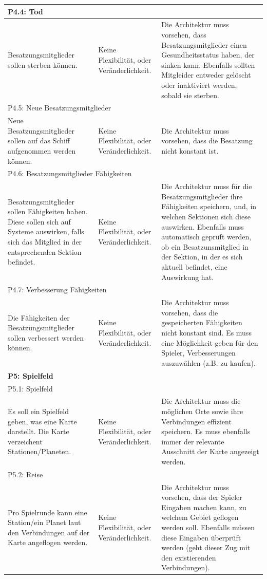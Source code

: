 \documentclass[fontsize=12pt,paper=a4,twoside]{scrartcl}
\begin{document}
\begin{longtable}[c]{|p{5cm}|p{5cm}|p{5cm}|}
\\ \hline
\multicolumn{3}{|l|}{{P4.4: Tod}} 
\\ \hline
Besatzungsmitglieder sollen sterben können. & Keine Flexibilität, oder Veränderlichkeit.    & Die Architektur muss vorsehen, dass Besatzungsmitglieder einen Gesundheitsstatus haben, der sinken kann. Ebenfalls sollten Mitgleider entweder gelöscht oder inaktiviert werden, sobald sie sterben. 
\\ \hline
\multicolumn{3}{|l|}{{P4.5: Neue Besatzungsmitglieder}} 
\\ \hline
Neue Besatzungsmitglieder sollen auf das Schiff aufgenommen werden können. & Keine Flexibilität, oder Veränderlichkeit.    &  Die Architektur muss vorsehen, dass die Besatzung nicht konstant ist. 
\\ \hline
\multicolumn{3}{|l|}{{P4.6: Besatzungsmitglieder Fähigkeiten}} 
\\ \hline
Besatzungsmitglieder sollen Fähigkeiten haben. Diese sollen sich auf Systeme auswirken, falls sich das Mitglied in der entsprechenden Sektion befindet. & Keine Flexibilität, oder Veränderlichkeit.    &  Die Architektur muss für die Besatzungsmitglieder ihre Fähigkeiten speichern, und, in welchen Sektionen sich diese auswirken. Ebenfalls muss automatisch geprüft werden, ob ein Besatzunsmitglied in der Sektion, in der es sich aktuell befindet, eine Auswirkung hat. 
\\ \hline
\multicolumn{3}{|l|}{{P4.7: Verbesserung Fähigkeiten}} 
\\ \hline
Die Fähigkeiten der Besatzungsmitglieder sollen verbessert werden können. & Keine Flexibilität, oder Veränderlichkeit.    & Die Architektur muss vorsehen, dass die gespeicherten Fähigkeiten nicht konstant sind. Es muss eine Möglichkeit geben für den Spieler, Verbesserungen auszuwählen (z.B. zu kaufen). 
\\ \hline
%
\multicolumn{3}{|l|}{{\textbf{P5: Spielfeld}}} 
\\ \hline         
\multicolumn{3}{|l|}{{P5.1: Spielfeld}} 
\\ \hline
Es soll ein Spielfeld geben, was eine Karte darstellt. Die Karte verzeichent Stationen/Planeten. & Keine Flexibilität, oder Veränderlichkeit.    & Die Architektur muss die möglichen Orte sowie ihre Verbindungen effizient speichern. Es muss ebenfalls immer der relevante Ausschnitt der Karte angezeigt werden. 
\\ \hline          
\multicolumn{3}{|l|}{{P5.2: Reise}} 
\\ \hline
Pro Spielrunde kann eine Station/ein Planet laut den Verbindungen auf der Karte angeflogen werden.  & Keine Flexibilität, oder Veränderlichkeit.    & Die Architektur muss vorsehen, dass der Spieler Eingaben machen kann, zu welchem Gebiet geflogen werden soll. Ebenfalls müssen diese Eingaben überprüft werden (geht dieser Zug mit den existierenden Verbindungen). 

\end{longtable}
\end{document}
